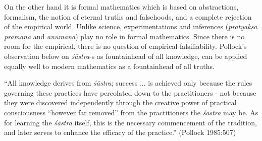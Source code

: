 On the other hand it is formal mathematics which is based on abstractions, formalism, the notion of eternal truths and falsehoods, and a complete rejection of the empirical world. Unlike science, experimentations and inferences ({\sl pratyakṣa pramāṇa} and {\sl anumāna}) play no role in formal mathematics. Since there is no room for the empirical, there is no question of empirical falsifiability. Pollock’s observation below on {\sl śāstra}-s as fountainhead of all knowledge, can be applied equally well to modern mathematics as a fountainhead of all truths.
\begin{myquote}
``All knowledge derives from {\sl śāstra}; success ... is achieved only because the rules governing these practices have percolated down to the practitioners - not because they were discovered independently through the creative power of practical consciousness ``however far removed'' from the practitioners the {\sl śāstra} may be. As for learning the {\sl śāstra} itself, this is the necessary commencement of the tradition, and later serves to enhance the efficacy of the practice.'' (Pollock 1985:507)
\end{myquote}

